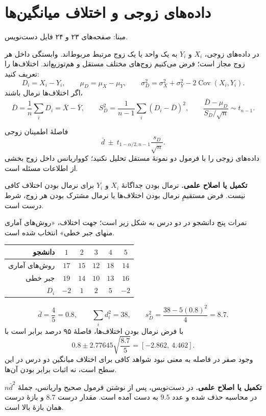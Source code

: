 \documentclass[12pt,a4paper,oneside]{report}
\newcounter{ex}[chapter]
\newenvironment{example}[1]{\refstepcounter{ex}\begin{tcolorbox}[breakable=false,title={مثال \thechapter.\arabic{ex} | #1},colframe=muted,colback=white]}{\end{tcolorbox}}
\newcommand{\edit}[1]{\par\begingroup\small\color{alert}\textbf{تکمیل یا اصلاح علمی.} #1\par\endgroup}
\newcommand{\source}[1]{\par{\small\color{muted} مبنا: صفحه‌های #1 فایل دست‌نویس.}\par}
\newcommand{\Cov}{\operatorname{Cov}}
\begin{document}
\section{داده‌های زوجی و اختلاف میانگین‌ها}
\source{۲۳ و ۲۴}
در داده‌های زوجی، $X_i$ و $Y_i$ به یک واحد یا یک زوج مرتبط مربوط‌اند. وابستگی داخل هر زوج مجاز است؛ فرض می‌کنیم زوج‌های مختلف مستقل و هم‌توزیع‌اند. اختلاف‌ها را تعریف کنید:
\[
D_i=X_i-Y_i,\qquad
\mu_D=\mu_X-\mu_Y,
\qquad\sigma_D^2=\sigma_X^2+\sigma_Y^2-2\Cov(X_i,Y_i).
\]
اگر اختلاف‌ها نرمال باشند،
\[
\bar D=\frac1n\sum_iD_i=\bar X-\bar Y,\qquad
S_D^2=\frac1{n-1}\sum_i(D_i-\bar D)^2,
\qquad
\frac{\bar D-\mu_D}{S_D/\sqrt n}\sim t_{n-1}.
\]
\begin{result}{فاصلهٔ اطمینان زوجی}
\[\boxed{\bar d\ \pm\ t_{1-\alpha/2,n-1}\frac{s_D}{\sqrt n}.}\]
داده‌های زوجی را با فرمول دو نمونهٔ مستقل تحلیل نکنید؛ کوواریانس داخل زوج بخشی از اطلاعات مسئله است.
\end{result}
\edit{نرمال بودن جداگانهٔ $X_i$ و $Y_i$ برای نرمال بودن اختلاف کافی نیست. فرض مستقیمِ نرمال بودن اختلاف‌ها یا نرمال مشترک بودن هر زوج، شرط درست است.}
\begin{example}{نمرات روش‌های آماری و جبر خطی}
نمرات پنج دانشجو در دو درس به شکل زیر است؛ جهت اختلاف، «روش‌های آماری منهای جبر خطی» انتخاب شده است.
\begin{center}
\begin{tabular}{r|ccccc}
\toprule
دانشجو&$1$&$2$&$3$&$4$&$5$\\
\midrule
روش‌های آماری&$17$&$15$&$12$&$18$&$14$\\
جبر خطی&$19$&$14$&$10$&$13$&$16$\\
$D_i$&$-2$&$1$&$2$&$5$&$-2$\\
\bottomrule
\end{tabular}
\end{center}
\[
\bar d=\frac45=0.8,\qquad \sum_i d_i^2=38,
\qquad s_D^2=\frac{38-5(0.8)^2}{4}=\boxed{8.7}.
\]
با فرض نرمال بودن اختلاف‌ها، فاصلهٔ ۹۵ درصد برابر است با
\[
0.8\pm2.77645\sqrt{\frac{8.7}{5}}
=\boxed{[-2.862,\ 4.462]}.
\]
وجود صفر در فاصله به معنی نبود شواهد کافی برای اختلاف میانگین دو درس در این سطح است، نه اثبات برابر بودن آن‌ها.
\edit{در دست‌نویس، پس از نوشتن فرمول صحیح واریانس، جملهٔ $n\bar d^2$ در محاسبه حذف شده و عدد $9.5$ به دست آمده است. مقدار درست $8.7$ و بازهٔ درست همان بازهٔ بالا است.}
\end{example}
\end{document}
